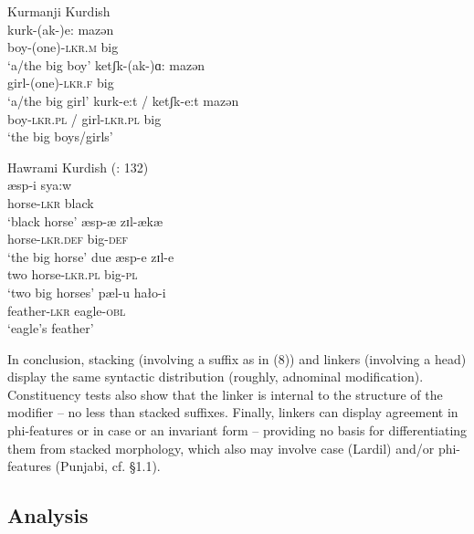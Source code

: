 \documentclass[output=paper]{langsci/langscibook}
\begin{document}
\ea%
    Kurmanji Kurdish \citep{Franco2015}\label{ex:manzini:19}\\
    \ea
    \gll kurk-(ak-)e:     mazən       \\
         boy-(one)-\textsc{lkr.m}    big     \\
    \glt ‘a/the big boy’
    \ex
    \gll ketʃk-(ak-)ɑ:    mazən      \\
         girl-(one)-\textsc{lkr.f}   big     \\
    \glt ‘a/the big girl’
    \ex
    \gll kurk-e:t / ketʃk-e:t     mazən     \\
         boy-\textsc{lkr.pl} / girl-\textsc{lkr.pl}  big   \\
    \glt ‘the big boys/girls’
    \z
\z


\ea%
    Hawrami Kurdish (\citealt{Holmberg2008}: 132)\label{ex:manzini:20}\\
    \ea
    \gll æsp-i     sya:w      \\
         horse-\textsc{lkr}  black\\
    \glt ‘black horse’
    \ex
    \gll æsp{}-æ     zɪl-ækæ\\
         horse-\textsc{lkr.def}  big-\textsc{def}\\
    \glt ‘the big horse’ 
    \ex
    \gll due   æsp-e    zɪl-e \\
         two   horse-\textsc{lkr.pl}  big-\textsc{pl} \\
    \glt ‘two big horses’
    \ex
    \gll pæl-u     hało-i\\
         feather-\textsc{lkr}   eagle-\textsc{obl}\\
    \glt ‘eagle’s feather’ 
    \z
\z        

In conclusion, stacking (involving a suffix as in (8)) and linkers (involving a head) display the same syntactic distribution (roughly, adnominal modification). Constituency tests also show that the linker is internal to the structure of the modifier – no less than stacked suffixes. Finally, linkers can display agreement in phi-features or in case or an invariant form – providing no basis for differentiating them from stacked morphology, which also may involve case (Lardil) and\slash or phi-features (Punjabi, cf. §1.1).

\subsection{Analysis}
\end{document}

